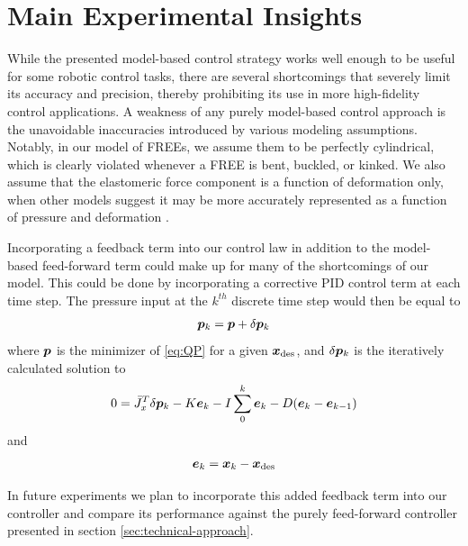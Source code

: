 \section{Main Experimental Insights}    \label{sec:insights}

While the presented model-based control strategy works well enough to be useful for some robotic control tasks, there are several shortcomings that severely limit its accuracy and precision, thereby prohibiting its use in more high-fidelity control applications. A weakness of any purely model-based control approach is the unavoidable inaccuracies introduced by various modeling assumptions. Notably, in our model of FREEs, we assume them to be perfectly cylindrical, which is clearly violated whenever a FREE is bent, buckled, or kinked. We also assume that the elastomeric force component is a function of deformation only, when other models suggest it may be more accurately represented as a function of pressure and deformation \cite{sedal2017constitutive}.

Incorporating a feedback term into our control law in addition to the model-based feed-forward term could make up for many of the shortcomings of our model. This could be done by incorporating a corrective PID control term at each time step. The pressure input at the $k^{th}$ discrete time step would then be equal to
\begin{align}
    \p_k = \p + \delta \p_k
\end{align}
where $\p$ is the minimizer of \eqref{eq:QP} for a given $\x_\tx{des}$, and $\delta \p_k$ is the iteratively calculated solution to 
\begin{align}
    0 = \J_x^T \delta \p_k - K \e_k - I \sum_0^{k} \e_k - D (\e_k - \e_{k-1})
\end{align}
and
\begin{align}
    \e_k = \x_k - \x_\tx{des}
\end{align}


In future experiments we plan to incorporate this added feedback term into our controller and compare its performance against the purely feed-forward controller presented in section \ref{sec:technical-approach}.

